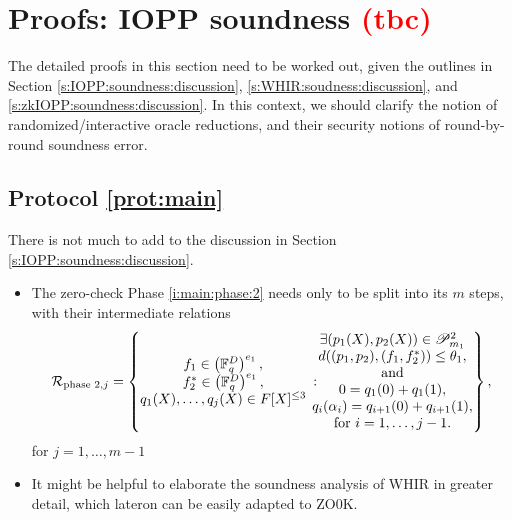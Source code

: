 \section{Proofs: IOPP soundness \textcolor{red}{(tbc)}}
\label{s:IOPPsoundness}

The detailed proofs in this section need to be worked out, given the outlines in Section \ref{s:IOPP:soundness:discussion}, \ref{s:WHIR:soudness:discussion}, and \ref{s:zkIOPP:soundness:discussion}.
In this context, we should clarify the notion of randomized/interactive oracle reductions, and their security notions of round-by-round soundness error. 


\subsection{Protocol \ref{prot:main} \tbc}

There is not much to add to the discussion in Section \ref{s:IOPP:soundness:discussion}. 
\begin{itemize}
    \item 
    The zero-check Phase \ref{i:main:phase:2} needs only to be split into its $m$ steps, with their intermediate relations 
    \begin{equation}
    \label{e:}
    \mathcal R_{\text{phase 2}, j} =
    \left\{
    \begin{matrix}
        f_1 \in \left(\mathbb F_q^{D}\right)^{e_1}, %
        \\
        f_2^* \in \left(\mathbb F_q^{D}\right)^{e_1}, %
        \\
        q_1(X), \ldots, q_j(X) \in F[X]^{\leq 3}
    \end{matrix}
    \::\:
    \hspace*{-3mm}
    \begin{matrix}
        \exists (p_1(X),p_2(X)) \in \mathscr P_{m_1}^2
        \\
        d((p_1,p_2), (f_1,f_2^*)) \leq \theta_1,
        \\\text{and}
        \\
        0 = q_1(0) + q_1(1),
        \\
        q_i(\alpha_i) = q_{i+1}(0) + q_{i+1}(1),
        \\
        \text{for }i = 1,\ldots, j-1.
    \end{matrix}
    \right\},
    \end{equation}
    for $j=1,\ldots,m-1$
    \item 
    It might be helpful to elaborate the soundness analysis of WHIR in greater detail, which lateron can be easily adapted to ZO0K.
\end{itemize}



